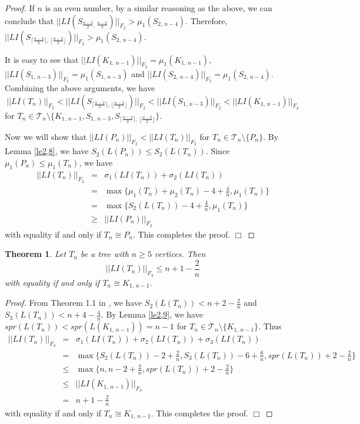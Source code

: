 \documentclass[12pt, a4paper]{article}
\newtheorem{theorem}{Theorem}[section]
\begin{document}
\begin{proof}
If $n$ is an even number, by a similar reasoning as the above, we can conclude that
$||LI(S_{\frac{n-2}{2}, \, \frac{n-2}{2}})||_{F_2}>\mu_1(S_{2,\,n-4})$. Therefore, $||LI(S_{\lceil\frac{n-2}{2}\rceil, \, \lfloor\frac{n-2}{2}\rfloor})||_{F_2}>\mu_1(S_{2,\,n-4})$.

It is easy to see that $||LI(K_{1,\,n-1})||_{F_2}=\mu_1(K_{1,\,n-1})$, $||LI(S_{1,\,n-3})||_{F_2}=\mu_1(S_{1,\,n-3})$ and $||LI(S_{2,\,n-4})||_{F_2}=\mu_1(S_{2,\,n-4})$. Combining the above arguments, we have
$$||LI(T_n)||_{F_2}<||LI(S_{\lceil\frac{n-2}{2}\rceil, \, \lfloor\frac{n-2}{2}\rfloor})||_{F_2}<||LI(S_{1,\,n-3})||_{F_2}<||LI(K_{1,\,n-1})||_{F_2}$$
for $T_n\in \mathcal{T}_n\setminus \{K_{1,\,n-1}, S_{1,\, n-3}, S_{\lceil\frac{n-2}{2}\rceil, \, \lfloor\frac{n-2}{2}\rfloor}\}$.

Now we will show that $||LI(P_n)||_{F_2}< ||LI(T_n)||_{F_2}$ for $T_n\in \mathcal{T}_n\setminus \{P_n\}$. By Lemma \ref{le2,8}, we have $S_2(L(P_n))\leq S_2(L(T_n))$. Since $\mu_1(P_n)\leq \mu_1(T_n)$, we have
\begin{eqnarray*}
||LI(T_n)||_{F_2} & = & \sigma_1(LI(T_n))+\sigma_2(LI(T_n))\\
& = & \max\{\mu_1(T_n)+\mu_2(T_n)-4+\frac{4}{n}, \mu_1(T_n)\}\\
& = & \max\{S_2(L(T_n))-4+\frac{4}{n}, \mu_1(T_n)\}\\
& \geq & ||LI(P_n)||_{F_2}
\end{eqnarray*}
with equality if and only if $T_n\cong P_n$. This completes the proof. $\Box$
\end{proof}


\begin{theorem}\label{th5,3} %
Let $T_n$ be a tree with $n\geq 5$ vertices. Then
$$||LI(T_n)||_{F_3}\leq n+1-\frac{2}{n}$$
with equality if and only if $T_n\cong K_{1,\,n-1}$.
\end{theorem}

\begin{proof} From Theorem 1.1 in \cite{FHRT}, we have $S_2(L(T_n))< n+2-\frac{2}{n}$ and $S_3(L(T_n))< n+4-\frac{4}{n}$. By Lemma \ref{le2,9}, we have $spr(L(T_n))<spr(L(K_{1,\,n-1}))=n-1$ for $T_n\in \mathcal{T}_n\setminus \{K_{1,\,n-1}\}$. Thus
\begin{eqnarray*}
||LI(T_n)||_{F_3} & = & \sigma_1(LI(T_n))+\sigma_2(LI(T_n))+\sigma_3(LI(T_n))\\
& = &  \max\{S_2(L(T_n))-2+\frac{2}{n}, S_3(L(T_n))-6+\frac{6}{n}, spr(L(T_n))+2-\frac{2}{n}\}\\
& \leq & \max\{n, n-2+\frac{2}{n}, spr(L(T_n))+2-\frac{2}{n}\}\\
& \leq & ||LI(K_{1,\,n-1})||_{F_3}\\
& = & n+1-\frac{2}{n}
\end{eqnarray*}
with equality if and only if $T_n\cong K_{1,\,n-1}$.
This completes the proof. $\Box$
\end{proof}
\end{document}
